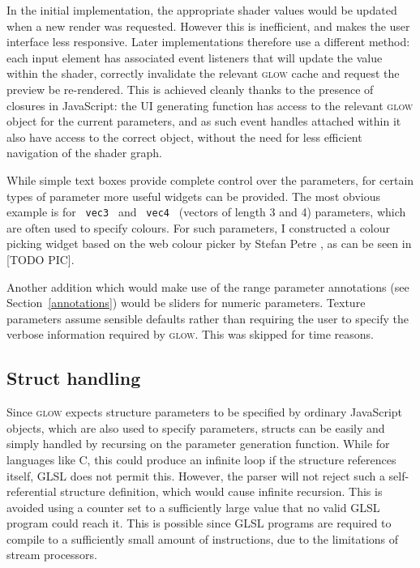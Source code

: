 \documentclass[12pt,twoside,notitlepage]{report}
\begin{document}
In the initial implementation, the appropriate shader values would be updated when a new render was requested. However this is inefficient, and makes the user interface less responsive. Later implementations therefore use a different method: each input element has associated event listeners that will update the value within the shader, correctly invalidate the relevant \textsc{glow} cache and request the preview be re-rendered. This is achieved cleanly thanks to the presence of closures in JavaScript: the UI generating function has access to the relevant \textsc{glow} object for the current parameters, and as such event handles attached within it also have access to the correct object, without the need for less efficient navigation of the shader graph. 

While simple text boxes provide complete control over the parameters, for certain types of parameter more useful widgets can be provided. The most obvious example is for \texttt{ vec3 } and \texttt{ vec4 } (vectors of length 3 and 4) parameters, which are often used to specify colours. For such parameters, I constructed a colour picking widget based on the web colour picker by Stefan Petre \cite{color}, as can be seen in [TODO PIC]. 

Another addition which would make use of the range parameter annotations (see Section~\ref{annotations}) would be sliders for numeric parameters. Texture parameters assume sensible defaults rather than requiring the user to specify the verbose information required by \textsc{glow}. This was skipped for time reasons.

\subsection*{Struct handling}
Since \textsc{glow} expects structure parameters to be specified by ordinary JavaScript objects, which are also used to specify parameters, structs can be easily and simply handled by recursing on the parameter generation function. While for languages like C, this could produce an infinite loop if the structure references itself, GLSL does not permit this. However, the parser will not reject such a self-referential structure definition, which would cause infinite recursion. This is avoided using a counter set to a sufficiently large value that no valid GLSL program could reach it. This is possible since GLSL programs are required to compile to a sufficiently small amount of instructions, due to the limitations of stream processors.
\end{document}
